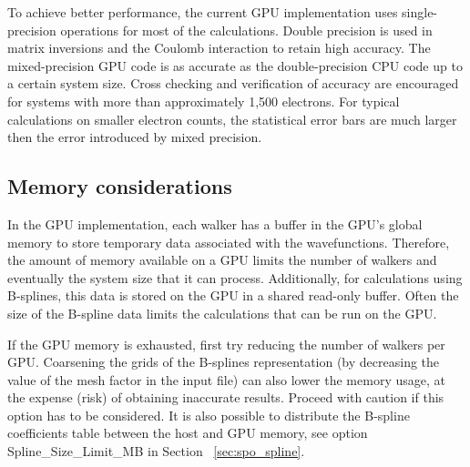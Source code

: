 To achieve better performance, the current GPU implementation uses
single-precision operations for most of the calculations. Double
precision is used in matrix inversions and the Coulomb interaction to
retain high accuracy. The mixed-precision GPU code is as accurate as
the double-precision CPU code up to a certain system size. Cross
checking and verification of accuracy are encouraged for systems with
more than approximately 1,500 electrons. For typical calculations on
smaller electron counts, the statistical error bars are much larger
then the error introduced by mixed precision.


\subsection{Memory considerations}

In the GPU implementation, each walker has a buffer in the GPU's
global memory to store temporary data associated with the
wavefunctions. Therefore, the amount of memory available on a GPU
limits the number of walkers and eventually the system size that it
can process. Additionally, for calculations using B-splines, this data
is stored on the GPU in a shared read-only buffer. Often the size of the
B-spline data limits the calculations that can be run on the GPU.

If the GPU memory is exhausted, first try reducing the number of walkers per GPU.
Coarsening the grids of the B-splines representation (by decreasing
the value of the mesh factor in the input file) can also lower the memory
usage, at the expense (risk) of obtaining inaccurate results. Proceed
with caution if this option has to be considered.  It is also possible
to distribute the B-spline coefficients table between the host and GPU
memory, see option Spline\_Size\_Limit\_MB in
Section ~\ref{sec:spo_spline}.

